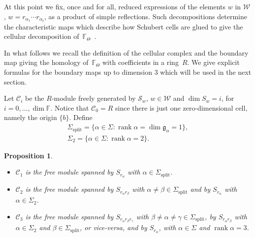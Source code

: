 \documentclass[pdftex]{sigma}
\numberwithin{equation}{section}
\newtheorem{Proposition}[Theorem]{Proposition}
 { \theoremstyle{definition}
\newtheorem{Definition}[Theorem]{Definition}
\newtheorem{Note}[Theorem]{Note}
\newtheorem{Example}[Theorem]{Example}
\newtheorem{Remark}[Theorem]{Remark} }
\begin{document}
At this point we fix, once and for all, reduced expressions of the elements $w$ in $\mathcal{W}$, $w=r_{\alpha_1}\cdots r_{\alpha_t}$, as a product of simple reflections. Such decompositions determine the characteristic maps which describe how Schubert cells are glued to give the cellular decomposition of~$\mathbb{F}_\Theta$~\cite{RSM}.

In what follows we recall the definition of the cellular complex and the boundary map giving the homology of~$\mathbb{F}_\Theta$ with coefficients in a ring~$R$. We give explicit formulas for the boundary maps up to dimension $3$ which will be used in the next section.

Let $\mathcal{C}_{i}$ be the $R$-module freely generated by $\mathcal{S}_{w}$, $w\in \mathcal{W}$ and $\dim S_{w}=i$, for $i=0,\ldots,\dim \mathbb{F}$. Notice that $\mathcal{C}_{0}=R$ since there is just one zero-dimensional cell, namely the origin $\{b\}$. Define
\begin{gather*}
\Sigma _{\mathrm{split}} =\{\alpha \in \Sigma \colon \operatorname{rank}\alpha =\dim \mathfrak{g}_{\alpha }=1\}, \\
\Sigma _{2} =\{\alpha \in \Sigma \colon \operatorname{rank}\alpha =2\}.
\end{gather*}

\begin{Proposition}\label{pro.chains}\quad
\begin{itemize}\itemsep=0pt
\item $\mathcal{C}_1$ is the free module spanned by $S_{r_\alpha}$ with $\alpha\in \Sigma_{\mathrm{split}}$.
\item $\mathcal{C}_{2}$ is the free module spanned by $S_{r_{\alpha}r_{\beta }}$ with $\alpha \neq \beta \in \Sigma _{\mathrm{split}}$ and by $S_{r_{\alpha }}$ with $\alpha \in \Sigma _{2}$.
\item $\mathcal{C}_{3}$ is the free module spanned by $S_{r_{\alpha}r_{\beta }r_{\gamma }}$ with $\beta \neq \alpha \neq \gamma \in \Sigma _{\mathrm{split}}$, by $S_{r_{\alpha }r_{\beta }}$ with $\alpha \in \Sigma_{2} $ and $\beta \in \Sigma _{\mathrm{split}}$, or vice-versa, and by $S_{r_{\alpha }}$, with $\alpha \in \Sigma $ and $\operatorname{rank}\alpha =3$.
\end{itemize}
\end{Proposition}
\end{document}
